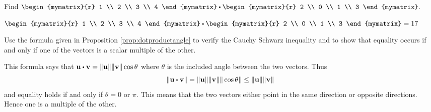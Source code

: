 \begin{enumialphparenastyle}

\begin{ex} Find $\begin{mymatrix}{r}
1 \\
2 \\
3 \\
4
\end{mymatrix} \dotprod \begin{mymatrix}{r}
2 \\
0 \\
1 \\
3
\end{mymatrix} .$
\begin{sol}
$\begin{mymatrix}{r}
1 \\
2 \\
3 \\
4
\end{mymatrix} \dotprod \begin{mymatrix}{r}
2 \\
0 \\
1 \\
3
\end{mymatrix} = 17$
\end{sol}
\end{ex}

\begin{ex} Use the formula given in Proposition \ref{prop:dotproductangle} to verify the Cauchy Schwarz inequality and
to show that equality occurs if and only if one of the vectors is a scalar
multiple of the other.
\begin{sol}
This formula says that $\vect{u}\dotprod \vect{v}=\vectlength
\vect{u}\vectlength \vectlength \vect{v}\vectlength \cos \theta $ where $
\theta $ is the included angle between the two vectors. Thus
\[
\vectlength \vect{u}\dotprod \vect{v}\vectlength =\vectlength \vect{u}\vectlength
\vectlength \vect{v}\vectlength \vectlength \cos \theta \vectlength \leq
\vectlength \vect{u}\vectlength \vectlength \vect{v}\vectlength
\]
and equality holds if and only if $\theta =0$ or $\pi $. This means that the
two vectors either point in the same direction or opposite directions. Hence
one is a multiple of the other.
\end{sol}
\end{ex}


\end{enumialphparenastyle}
